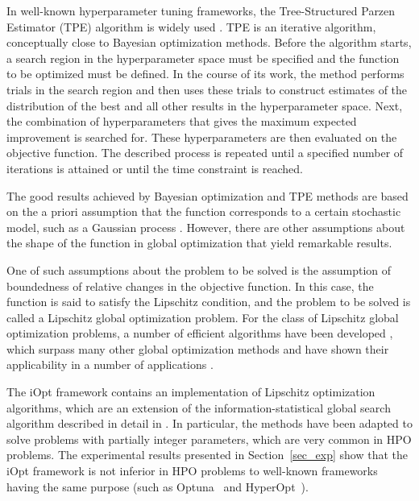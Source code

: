 \documentclass[iicol]{sn-jnl}
\theoremstyle{thmstyleone}%
\theoremstyle{thmstyletwo}%
\theoremstyle{thmstylethree}%
\begin{document}
In well-known hyperparameter tuning frameworks, the Tree-Structured Parzen Estimator (TPE) algorithm is widely used \citep{hyperopt,NIPS2011}. TPE is an iterative algorithm, conceptually close to Bayesian optimization methods. Before the algorithm starts, a search region in the hyperparameter space must be specified and the function to be optimized must be defined. In the course of its work, the method performs trials in the search region and then uses these trials to construct estimates of the distribution of the best and all other results in the hyperparameter space. Next, the combination of hyperparameters that gives the maximum expected improvement is searched for. These hyperparameters are then evaluated on the objective function. The described process is repeated until a specified number of iterations is attained or until the time constraint is reached.  

The good results achieved by Bayesian optimization \citep{Joy2020} and TPE \citep{Watanabe2022a,Watanabe2022b} methods are based on the a priori assumption that the function corresponds to a certain stochastic model, such as a Gaussian process \citep{Rasmussen2005}. However, there are other assumptions about the shape of the function in global optimization that yield remarkable results. 

One of such assumptions about the problem to be solved is the assumption of boundedness of relative changes in the objective function. In this case, the function is said to satisfy the Lipschitz condition, and the problem to be solved is called a Lipschitz global optimization problem. For the class of Lipschitz global optimization problems, a number of efficient algorithms have been developed \citep{Jones2021,Paulavicius2020,Strongin2020,Sergeyev2017,PaulaviciusZilinskas2014}, which surpass many other global optimization methods \citep{Sergeyev2018} and have shown their applicability in a number of applications \citep{Kvasov2008,CANDELIERI2019,Gubaydullin2021}.

The iOpt framework contains an implementation of Lipschitz optimization algorithms, which are an extension of the information-statistical global search algorithm described in detail in \citet{Strongin2000,Sergeyev2013}. In particular, the methods have been adapted to solve problems with partially integer parameters, which are very common in HPO problems. The experimental results presented in Section~\ref{sec_exp} show that the iOpt framework is not inferior in HPO problems to well-known frameworks having the same purpose (such as Optuna~\citep{optuna} and HyperOpt~\citep{hyperopt}).
\end{document}
